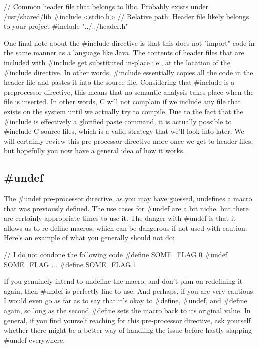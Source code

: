 \documentclass{article}
\begin{document}
\begin{clst}
// Common header file that belongs to libc. Probably exists under /usr/shared/lib
#include <stdio.h>
// Relative path. Header file likely belongs to your project
#include "../../header.h"
\end{clst}

One final note about the \#include directive is that this does not "import" code in the same manner as a
language like Java. The contents of header files that are included with \#include get substituted in-place
i.e., at the location of the \#include directive. In other words, \#include essentially copies all the code in
the header file and pastes it into the source file. Considering that \#include is a preprocessor directive,
this means that no semantic analysis takes place when the file is inserted. In other words, C will not
complain if we include any file that exists on the system until we actually try to compile. Due to the fact that
the \#include is effectively a glorified paste command, it is actually possible to \#include C source files,
which is a valid strategy that we'll look into later. We will certainly review this pre-processor directive more
once we get to header files, but hopefully you now have a general idea of how it works.

\subsection{\#undef}

The \#undef pre-processor directive, as you may have guessed, undefines a macro that was previously defined.
The use cases for \#undef are a bit niche, but there are certainly appropriate times to use it. The danger
with \#undef is that it allows us to re-define macros, which can be dangerous if not used with caution. Here's
an example of what you generally should not do:

\begin{clst}
// I do not condone the following code
#define SOME_FLAG 0
#undef SOME_FLAG
...
#define SOME_FLAG 1
\end{clst}

If you genuinely intend to undefine the macro, and don't plan on redefining it again, then \#undef is
perfectly fine to use. And perhaps, if you are very cautious, I would even go as far as to say that it's okay
to \#define, \#undef, and \#define again, so long as the second \#define sets the macro back to its original
value. In general, if you find yourself reaching for this pre-processor directive, ask yourself whether there
might be a better way of handling the issue before hastly slapping \#undef everywhere.
\end{document}
